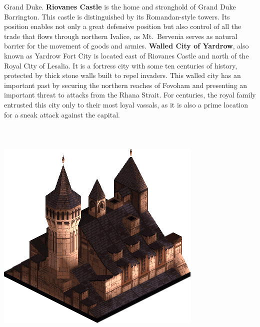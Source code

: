 Grand Duke.
\textbf{Riovanes Castle} is the home and stronghold of Grand Duke Barrington. 
This castle is distinguished by its Romandan-style towers.
Its position enables not only a great defensive position but also control of all the trade that flows through northern Ivalice, as Mt.~Bervenia serves as natural barrier for the movement of goods and armies.
\textbf{Walled City of Yardrow}, also known as Yardrow Fort City is located east of Riovanes Castle and north of the Royal City of Lesalia. It is a fortress city with some ten centuries of history, protected by thick stone walls built to repel invaders. 
This walled city has an important past by securing the northern reaches of Fovoham and presenting an important threat to attacks from the Rhana Strait. 
For centuries, the royal family entrusted this city only to their most loyal vassals, as it is also a prime location for a sneak attack against the capital.
%
\\\\\\\\
\includegraphics[width=\columnwidth]{./art/images/riovanes.png}
%
\\\\\\
%
\pagebreak\\

